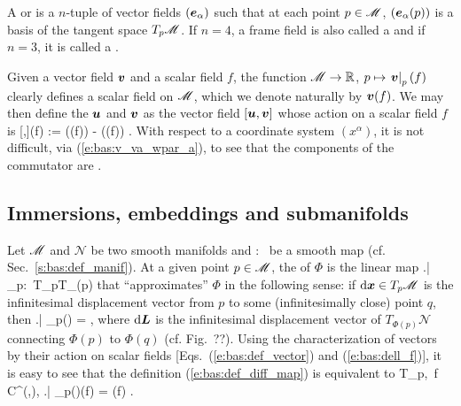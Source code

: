 A  or
 is a $n$-tuple of vector fields
$(\bm{e}_\alpha)$ such that at each point $p\in\mathscr{M}$, $(\bm{e}_\alpha(p))$ is
a basis of the tangent space $T_p\mathscr{M}$.
If $n=4$, a frame field is also called a  and if $n=3$,
it is called a
.

Given a vector field $\bm{v}$ and a scalar field $f$, the function
$\mathscr{M}\rightarrow \mathbb{R}$, $p\mapsto \left.\bm{v}\right|_p(f)$ clearly defines a scalar field on
$\mathscr{M}$, which we denote naturally by $\bm{v}(f)$.
We may then define the  $\bm{u}$
and $\bm{v}$ as the vector field $[\bm{u},\bm{v}]$ whose action on a scalar field $f$ is
\be \label{e:bas:def_commutator}
  [,](f) := ((f)) - ((f)) .
\ee
With respect to a coordinate system $(x^\alpha)$, it is not difficult, via
(\ref{e:bas:v_va_wpar_a}), to see that the components of the commutator are
\be \label{e:bas:commut_comp}
   .
\ee

\subsection{Immersions, embeddings and submanifolds} \label{s:bas:embed}

Let $\mathscr{M}$ and $\mathscr{N}$ be two smooth manifolds
and
\be
    \Phi:\ \M \longrightarrow {}
\ee
be a smooth map (cf. Sec.~\ref{s:bas:def_manif}).
At a given point $p\in\mathscr{M}$, the 
of $\Phi$ is the linear map
\be
    \left.\D\Phi \right| _p:\ T_p\M \longrightarrow T_{\Phi(p)}
\ee
that ``approximates'' $\Phi$ in the following sense: if $\mathrm{d}\bm{x}\in T_p\mathscr{M}$ is the
infinitesimal displacement vector from $p$ to some (infinitesimally close) point $q$,
then
\be \label{e:bas:def_diff_map}
    \left.\D\Phi \right| _p(\D{}) = \D{},
\ee
where $\mathrm{d}\bm{L}$ is the infinitesimal displacement vector of $T_{\Phi(p)}\mathscr{N}$
connecting $\Phi(p)$ to $\Phi(q)$ (cf. Fig.~??).
Using the characterization of vectors by their action on scalar fields
[Eqs.~(\ref{e:bas:def_vector}) and (\ref{e:bas:dell_f})], it is easy to see
that the definition (\ref{e:bas:def_diff_map}) is equivalent to
\be
    \forall {}\in T_p\M,\ \forall f \in C^\infty(,),\quad
    \left.\D\Phi \right| _p()(f) =
        \left(f\circ \Phi \right) .
\ee

